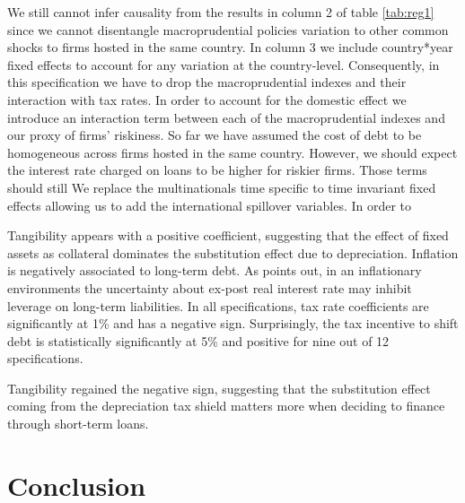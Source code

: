 \documentclass[12pt]{article}
\begin{document}
We still cannot infer causality from the results in column 2 of table \ref{tab:reg1} since we cannot disentangle macroprudential policies variation to other common shocks to firms hosted in the same country.  In column 3 we include country*year fixed effects to account for any variation at the country-level. Consequently, in this specification we have to drop the macroprudential indexes and their interaction with tax rates. In order to account for the domestic effect we introduce an interaction term between each of the macroprudential indexes and our proxy of firms' riskiness. So far we have assumed the cost of debt to be homogeneous across firms hosted in the same country. However, we should expect the interest rate charged on loans to be higher for riskier firms. Those terms should still    We replace the multinationals time specific to time invariant fixed effects allowing us to add the international spillover variables. In order to   
	
 Tangibility appears with a positive coefficient, suggesting that the effect of fixed assets as collateral dominates the substitution effect due to depreciation. Inflation is negatively associated to long-term debt. As \cite{huizinga2008capital} points out, in an inflationary environments the uncertainty about ex-post real interest rate may inhibit leverage on long-term liabilities. In all specifications, tax rate coefficients are significantly at 1\% and has a negative sign. Surprisingly, the tax incentive to shift debt is statistically significantly at 5\% and positive for nine out of 12 specifications.
	
Tangibility regained the negative sign, suggesting that the substitution effect coming from the depreciation tax shield matters more when deciding to finance through short-term loans. 


	\section{Conclusion} \label{sec:conclusion}
	
\end{document}
